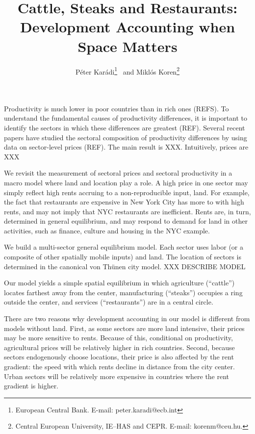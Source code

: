 \documentclass[12pt]{article}
\begin{document}
\title{Cattle, Steaks and Restaurants: Development Accounting when Space Matters}
\author{Péter Karádi\thanks{European Central Bank. E-mail: peter.karadi@ecb.int}~ and Miklós Koren\thanks{Central European University, IE--HAS and CEPR. E-mail: korenm@ceu.hu.}}
\maketitle

\begin{abstract}
\end{abstract}

Productivity is much lower in poor countries than in rich ones (REFS). To understand the fundamental causes of productivity differences, it is important to identify the sectors in which these differences are greatest (REF). Several recent papers have studied the sectoral composition of productivity differences by using data on sector-level prices (REF). The main result is XXX. Intuitively, prices are XXX

We revisit the measurement of sectoral prices and sectoral productivity in a macro model where land and location play a role. A high price in one sector may simply reflect high rents accruing to a non-reproducible input, land. For example, the fact that restaurants are expensive in New York City has more to with high rents, and may not imply that NYC restaurants are inefficient. Rents are, in turn, determined in general equilibrium, and may respond to demand for land in other activities, such as finance, culture and housing in the NYC example.

We build a multi-sector general equilibrium model. Each sector uses labor (or a composite of other spatially mobile inputs) and land. The location of sectors is determined in the canonical von Thünen city model. XXX DESCRIBE MODEL

Our model yields a simple spatial equilibrium in which agriculture (``cattle'') locates farthest away from the center, manufacturing (``steaks'') occupies a ring outside the center, and services (``restaurants'') are in a central circle.

There are two reasons why development accounting in our model is different from models without land. First, as some sectors are more land intensive, their prices may be more sensitive to rents. Because of this, conditional on productivity, agricultural prices will be relatively higher in rich countries. Second, because sectors endogenously choose locations, their price is also affected by the rent gradient: the speed with which rents decline in distance from the city center. Urban sectors will be relatively more expensive in countries where the rent gradient is higher.
\end{document}
